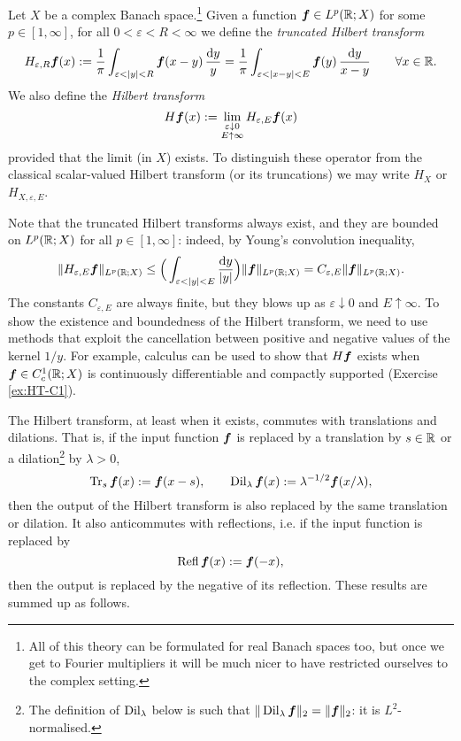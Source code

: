 \begin{defn}
  Let $X$ be a complex Banach space.\footnote{All of this theory can be formulated for real Banach spaces too, but once we get to Fourier multipliers it will be much nicer to have restricted ourselves to the complex setting.}
  Given a function $\bm{f} \in L^p(\mathbb{R};X)$ for some $p \in [1,\infty]$, for all $0 < \varepsilon < R < \infty$ we define the \emph{truncated Hilbert transform}
  \begin{equation*}
    H_{\varepsilon,R} \bm{f}(x) :=  \frac{1}{\pi} \int_{\varepsilon < |y| < R} \bm{f}(x-y) \, \frac{\mathrm{d} y}{y} =  \frac{1}{\pi} \int_{\varepsilon < |x-y| < E} \bm{f}(y) \, \frac{\mathrm{d} y}{x-y} \qquad \forall x \in \mathbb{R}.
  \end{equation*}
  We also define the \emph{Hilbert transform}
  \begin{equation*}
    H\bm{f}(x) := \lim_{\substack{\varepsilon \downarrow 0 \\ E \uparrow \infty}} H_{\varepsilon,E}\bm{f}(x)
  \end{equation*}
  provided that the limit (in $X$) exists.
  To distinguish these operator from the classical scalar-valued Hilbert transform (or its truncations) we may write $H_{X}$ or $H_{X, \varepsilon, E}$.
\end{defn}

Note that the truncated Hilbert transforms always exist, and they are bounded on $L^p(\mathbb{R};X)$ for all $p \in [1,\infty]$: indeed, by Young's convolution inequality,
\begin{equation*}
  \|H_{\varepsilon,E} \bm{f}\|_{L^p(\mathbb{R};X)} \leq \Big( \int_{\varepsilon < |y| < E} \frac{\mathrm{d} y}{|y|} \Big) \|\bm{f}\|_{L^p(\mathbb{R};X)} = C_{\varepsilon,E}  \|\bm{f}\|_{L^p(\mathbb{R};X)}.
\end{equation*}
The constants $C_{\varepsilon,E}$ are always finite, but they blows up as $\varepsilon \downarrow 0$ and $E \uparrow \infty$.
To show the existence and boundedness of the Hilbert transform, we need to use methods that exploit the cancellation between positive and negative values of the kernel $1/y$.
For example, calculus can be used to show that $H\bm{f}$ exists when $\bm{f} \in C_{c}^1(\mathbb{R};X)$ is continuously differentiable and compactly supported (Exercise \ref{ex:HT-C1}).

The Hilbert transform, at least when it exists, commutes with translations and dilations.
That is, if the input function $\bm{f}$ is replaced by a translation by $s \in \mathbb{R}$ or a dilation\footnote{The definition of $\operatorname{Dil}_{\lambda}$ below is such that $\|\operatorname{Dil}_{\lambda} \bm{f}\|_{2} = \|\bm{f}\|_{2}$: it is $L^2$-normalised.} by $\lambda > 0$,
\begin{equation*}
  \operatorname{Tr}_{s} \bm{f} (x) := \bm{f}(x - s), \qquad \operatorname{Dil}_{\lambda} \bm{f}(x) := \lambda^{-1/2}\bm{f}(x/\lambda), 
\end{equation*}
then the output of the Hilbert transform is also replaced by the same translation or dilation.
It also anticommutes with reflections, i.e. if the input function is replaced by
\begin{equation*}
  \operatorname{Refl} \bm{f}(x) := \bm{f}(-x),
\end{equation*}
then the output is replaced by the negative of its reflection.
These results are summed up as follows.

